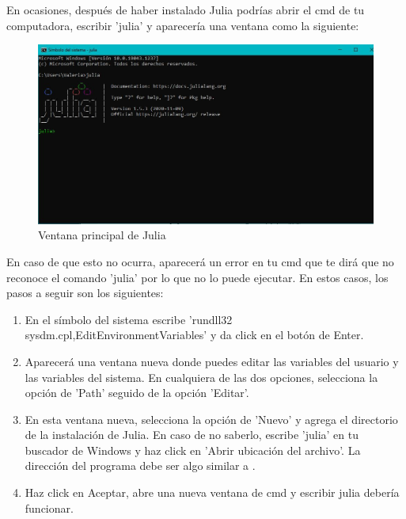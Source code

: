 
En ocasiones, después de haber instalado Julia podrías abrir el cmd de tu computadora, escribir 'julia' y aparecería una ventana como la siguiente: 

\begin{figure}[h]
\begin{center}
\includegraphics[scale=0.45]{Imagenes/julia_main_windows.JPG}
 \caption{Ventana principal de Julia}
  \label{main_Julia}
\end{center}
\end{figure}

En caso de que esto no ocurra, aparecerá un error en tu cmd que te dirá que no reconoce el comando 'julia' por lo que no lo puede ejecutar. En estos casos, los pasos a seguir son los siguientes:

\begin{enumerate}
    \item En el símbolo del sistema escribe 'rundll32 sysdm.cpl,EditEnvironmentVariables' y da click en el botón de Enter.
    \item Aparecerá una ventana nueva donde puedes editar las variables del usuario y las variables del sistema. En cualquiera de las dos opciones, selecciona la opción de 'Path' seguido de la opción 'Editar'. 
    \item En esta ventana nueva, selecciona la opción de 'Nuevo' y agrega el directorio de la instalación de Julia. En caso de no saberlo, escribe 'julia' en tu buscador de Windows y haz click en 'Abrir ubicación del archivo'. La dirección del programa debe ser algo similar a .
    \item Haz click en Aceptar, abre una nueva ventana de cmd y escribir julia debería funcionar. 
\end{enumerate}

